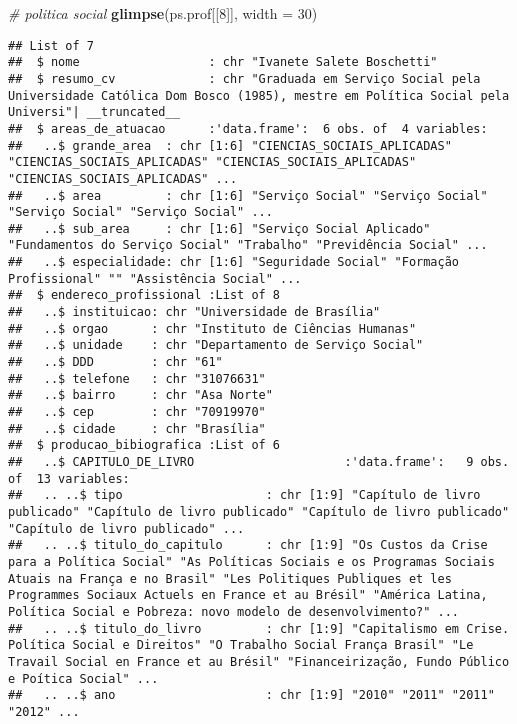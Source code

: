 \documentclass[]{article}
\newenvironment{Shaded}{\begin{snugshade}}{\end{snugshade}}
\newcommand{\KeywordTok}[1]{\textcolor[rgb]{0.13,0.29,0.53}{\textbf{#1}}}
\newcommand{\DataTypeTok}[1]{\textcolor[rgb]{0.13,0.29,0.53}{#1}}
\newcommand{\DecValTok}[1]{\textcolor[rgb]{0.00,0.00,0.81}{#1}}
\newcommand{\CommentTok}[1]{\textcolor[rgb]{0.56,0.35,0.01}{\textit{#1}}}
\newcommand{\NormalTok}[1]{#1}
\begin{document}
\begin{Shaded}
\begin{Highlighting}[]
\CommentTok{# politica social}
\KeywordTok{glimpse}\NormalTok{(ps.prof[[}\DecValTok{8}\NormalTok{]], }\DataTypeTok{width =} \DecValTok{30}\NormalTok{)}
\end{Highlighting}
\end{Shaded}

\begin{verbatim}
## List of 7
##  $ nome                  : chr "Ivanete Salete Boschetti"
##  $ resumo_cv             : chr "Graduada em Serviço Social pela Universidade Católica Dom Bosco (1985), mestre em Política Social pela Universi"| __truncated__
##  $ areas_de_atuacao      :'data.frame':  6 obs. of  4 variables:
##   ..$ grande_area  : chr [1:6] "CIENCIAS_SOCIAIS_APLICADAS" "CIENCIAS_SOCIAIS_APLICADAS" "CIENCIAS_SOCIAIS_APLICADAS" "CIENCIAS_SOCIAIS_APLICADAS" ...
##   ..$ area         : chr [1:6] "Serviço Social" "Serviço Social" "Serviço Social" "Serviço Social" ...
##   ..$ sub_area     : chr [1:6] "Serviço Social Aplicado" "Fundamentos do Serviço Social" "Trabalho" "Previdência Social" ...
##   ..$ especialidade: chr [1:6] "Seguridade Social" "Formação Profissional" "" "Assistência Social" ...
##  $ endereco_profissional :List of 8
##   ..$ instituicao: chr "Universidade de Brasília"
##   ..$ orgao      : chr "Instituto de Ciências Humanas"
##   ..$ unidade    : chr "Departamento de Serviço Social"
##   ..$ DDD        : chr "61"
##   ..$ telefone   : chr "31076631"
##   ..$ bairro     : chr "Asa Norte"
##   ..$ cep        : chr "70919970"
##   ..$ cidade     : chr "Brasília"
##  $ producao_bibiografica :List of 6
##   ..$ CAPITULO_DE_LIVRO                     :'data.frame':   9 obs. of  13 variables:
##   .. ..$ tipo                    : chr [1:9] "Capítulo de livro publicado" "Capítulo de livro publicado" "Capítulo de livro publicado" "Capítulo de livro publicado" ...
##   .. ..$ titulo_do_capitulo      : chr [1:9] "Os Custos da Crise para a Política Social" "As Políticas Sociais e os Programas Sociais Atuais na França e no Brasil" "Les Politiques Publiques et les Programmes Sociaux Actuels en France et au Brésil" "América Latina, Política Social e Pobreza: novo modelo de desenvolvimento?" ...
##   .. ..$ titulo_do_livro         : chr [1:9] "Capitalismo em Crise. Política Social e Direitos" "O Trabalho Social França Brasil" "Le Travail Social en France et au Brésil" "Financeirização, Fundo Público e Poítica Social" ...
##   .. ..$ ano                     : chr [1:9] "2010" "2011" "2011" "2012" ...

\end{verbatim}
\end{document}
